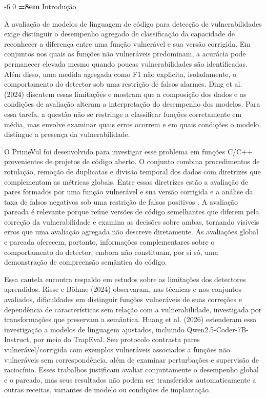 \documentclass[12pt,a4paper]{article}
\makeatletter
\newcommand{\XIIIPT}{\@setfontsize\xiiipt{13}{17}}
\renewcommand\section{\@startsection{section}{1}{\z@}%
                       {-6\p@ \@plus -4\p@ \@minus -4\p@}%
                       {0\p@ \@plus 4\p@ \@minus 4\p@}%
                       {\normalfont\XIIIPT\bfseries\boldmath
                        \rightskip=\z@ \@plus 8em\pretolerance=10000 }}
\makeatother
\begin{document}
\section{Introdução}
\label{sec:introducao}

A avaliação de modelos de linguagem de código para detecção de vulnerabilidades exige distinguir o desempenho agregado de classificação da capacidade de reconhecer a diferença entre uma função vulnerável e sua versão corrigida. Em conjuntos nos quais as funções não vulneráveis predominam, a acurácia pode permanecer elevada mesmo quando poucas vulnerabilidades são identificadas. Além disso, uma medida agregada como F1 não explicita, isoladamente, o comportamento do detector sob uma restrição de falsos alarmes. Ding et al. (2024) discutem essas limitações e mostram que a composição dos dados e as condições de avaliação alteram a interpretação do desempenho dos modelos. Para essa tarefa, a questão não se restringe a classificar funções corretamente em média, mas envolve examinar quais erros ocorrem e em quais condições o modelo distingue a presença da vulnerabilidade.

O PrimeVul foi desenvolvido para investigar esse problema em funções C/C++ provenientes de projetos de código aberto. O conjunto combina procedimentos de rotulação, remoção de duplicatas e divisão temporal dos dados com diretrizes que complementam as métricas globais. Entre essas diretrizes estão a avaliação de pares formados por uma função vulnerável e sua versão corrigida e a análise da taxa de falsos negativos sob uma restrição de falsos positivos \cite{ding2024primevul}. A avaliação pareada é relevante porque reúne versões de código semelhantes que diferem pela correção da vulnerabilidade e examina as decisões sobre ambas, tornando visíveis erros que uma avaliação agregada não descreve diretamente. As avaliações global e pareada oferecem, portanto, informações complementares sobre o comportamento do detector, embora não constituam, por si só, uma demonstração de compreensão semântica do código.

Essa cautela encontra respaldo em estudos sobre as limitações dos detectores aprendidos. Risse e Böhme (2024) observaram, nas técnicas e nos conjuntos avaliados, dificuldades em distinguir funções vulneráveis de suas correções e dependência de características sem relação com a vulnerabilidade, investigada por transformações que preservam a semântica. Huang et al. (2026) estenderam essa investigação a modelos de linguagem ajustados, incluindo Qwen2.5-Coder-7B-Instruct, por meio do TrapEval. Seu protocolo contrasta pares vulnerável/corrigida com exemplos vulneráveis associados a funções não vulneráveis sem correspondência, além de examinar perturbações e supervisão de raciocínio. Esses trabalhos justificam avaliar conjuntamente o desempenho global e o pareado, mas seus resultados não podem ser transferidos automaticamente a outras receitas, variantes de modelo ou condições de implantação.
\end{document}
